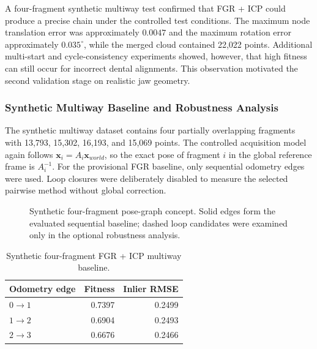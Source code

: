 A four-fragment synthetic multiway test confirmed that FGR + ICP could produce a precise chain under the controlled test conditions. The maximum node translation error was approximately $0.0047$ and the maximum rotation error approximately $0.035^\circ$, while the merged cloud contained 22,022 points. Additional multi-start and cycle-consistency experiments showed, however, that high fitness can still occur for incorrect dental alignments. This observation motivated the second validation stage on realistic jaw geometry.

\subsubsection{Synthetic Multiway Baseline and Robustness Analysis}

The synthetic multiway dataset contains four partially overlapping fragments with 13,793, 15,302, 16,193, and 15,069 points. The controlled acquisition model again follows $\mathbf{x}_i=A_i\mathbf{x}_{world}$, so the exact pose of fragment $i$ in the global reference frame is $A_i^{-1}$. For the provisional FGR baseline, only sequential odometry edges were used. Loop closures were deliberately disabled to measure the selected pairwise method without global correction.

\begin{figure}[!t]
\centering
{}
\caption{Synthetic four-fragment pose-graph concept. Solid edges form the evaluated sequential baseline; dashed loop candidates were examined only in the optional robustness analysis.}
\label{fig:synthetic-pose-graph}
\end{figure}

\begin{table}[H]
\centering
\footnotesize
\begin{tabular}{lrr}
\toprule
\textbf{Odometry edge} & \textbf{Fitness} & \textbf{Inlier RMSE} \\
\midrule
$0\rightarrow1$ & 0.7397 & 0.2499 \\
$1\rightarrow2$ & 0.6904 & 0.2493 \\
$2\rightarrow3$ & 0.6676 & 0.2466 \\
\bottomrule
\end{tabular}
\caption{Synthetic four-fragment FGR + ICP multiway baseline.}
\label{tab:synthetic-multiway-edges}
\end{table}

